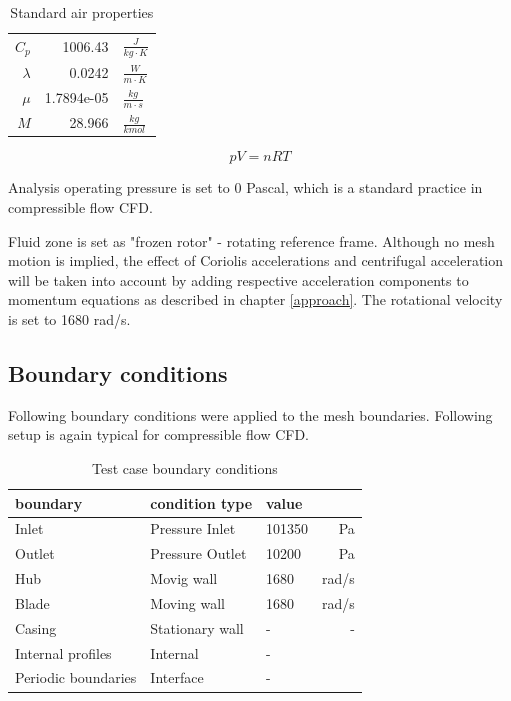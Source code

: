 \begin{table}[htb!]
\centering
\caption{Standard air properties} \label{tab:stdair}
\begin{tabular}{ r r l }
$C_p$ & 1006.43 & $\frac{J}{kg \cdot K}$ \\
$\lambda$ & 0.0242 & $\frac{W}{m \cdot K}$ \\
$\mu$ & 1.7894e-05 & $\frac{kg}{m \cdot s}$ \\
$M$ & 28.966 & $\frac{kg}{kmol}$ \\
\end{tabular}
\end{table}

\begin{equation} \label{eq:stadair}
p V = n R T
\end{equation}

Analysis operating pressure is set to 0 Pascal, which is a standard practice in compressible flow CFD.

Fluid zone is set as "frozen rotor" - rotating reference frame. Although no mesh motion is implied, the effect of Coriolis accelerations and centrifugal acceleration will be taken into account by adding respective acceleration components to momentum equations as described in chapter \ref{approach}. The rotational velocity is set to 1680 rad/s.

\subsection{Boundary conditions} \label{casebc}
Following boundary conditions were applied to the mesh boundaries. Following setup is again typical for compressible flow CFD.

\begin{table}[htb!]
\centering
\caption{Test case boundary conditions} \label{tab:testbcs}
\begin{tabular}{ l | l | l | r }
\textbf{boundary} & \textbf{condition type} & \textbf{value} & \\ \hline
Inlet & Pressure Inlet & 101350  & Pa\\ \hline
Outlet & Pressure Outlet & 10200 & Pa \\ \hline
Hub & Movig wall & 1680 & rad/s\\ \hline
Blade & Moving wall & 1680 & rad/s \\ \hline
Casing & Stationary wall & - & - \\ \hline
Internal profiles & Internal & - \\ \hline
Periodic boundaries & Interface & - \\ \hline 
\end{tabular}
\end{table}

